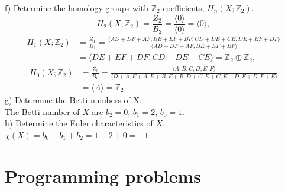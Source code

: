 \documentclass[a4paper,11pt]{article}
\begin{document}
f) Determine the homology groups with $\mathbb{Z}_2$ coefficients, $H_n(X;\mathbb{Z}_2)$.
$$
H_2(X;\mathbb{Z}_2) = \frac{Z_2}{B_2} = \frac{\langle 0 \rangle}{\langle 0 \rangle} = \langle 0 \rangle,
$$
\begin{align*}
H_1(X;\mathbb{Z}_2) &= \frac{Z_1}{B_1} = \frac{\langle AD + DF + AF, BE + EF + BF, CD + DE + CE, DE + EF + DF \rangle}{\langle AD + DF + AF, BE + EF + BF\rangle} 
\\
&= \langle DE + EF + DF, CD + DE + CE \rangle = \mathbb{Z}_2 \oplus \mathbb{Z}_2,
\end{align*}
\begin{align*}
H_0(X;\mathbb{Z}_2) &= \frac{Z_0}{B_0} = \frac{\langle A, B, C, D, E, F \rangle}{\langle D + A, F + A, E + B, F + B, D + C, E + C, E + D, F + D, F + E \rangle} 
\\
&= \langle A \rangle = \mathbb{Z}_2.
\end{align*}
g) Determine the Betti numbers of X.
\\
The Betti number of $X$ are $b_2 = 0$, $b_1 = 2$, $b_0 = 1$.
\\
h) Determine the Euler characteristics of $X$.
\\
$\chi(X) = b_0 - b_1 + b_2 = 1 - 2 + 0 = -1$.


\section{Programming problems}
\end{document}
